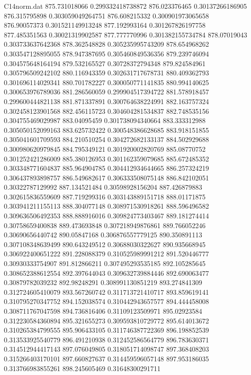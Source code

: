\begin{filecontents}{C14norm.dat}
875.731018066			0.299332418738872
876.023376465			0.30137266186905
876.315795898			0.303059049264751
876.608215332			0.300901973065658
876.90057373			0.301521149913248
877.192993164			0.301267826197758
877.485351563			0.30021319902587
877.777770996			0.301382155734784
878.07019043			0.303733637642368
878.362548828			0.305235995743209
878.654968262			0.303547128895055
878.947387695			0.305460849536356
879.239746094			0.304575648164194
879.532165527			0.30728372794348
879.824584961			0.305796509242102
880.116943359			0.302631717678731
880.409362793			0.301696114029341
880.701782227			0.300050771141835
880.994140625			0.300653976789036
881.286560059			0.299904517394722
881.578918457			0.299600444821138
881.871337891			0.300764638224991
882.163757324			0.302458123901568
882.456115723			0.304604281534837
882.748535156			0.304755469029987
883.04095459			0.301738094340664
883.333312988			0.305050152099163
883.625732422			0.300548386628685
883.918151855			0.305041601709593
884.210510254			0.304272682133137
884.502929688			0.300980620979845
884.795349121			0.301920002820769
885.08770752			0.301252421286009
885.380126953			0.301162359079685
885.672485352			0.303348771604837
885.964904785			0.304412934644665
886.257324219			0.306437893898757
886.549682617			0.306333508075148
886.842102051			0.30322787129992
887.134521484			0.30598928156204
887.426879883			0.302615836559609
887.719299316			0.303143889151718
888.01171875			0.303941211155113
888.304077148			0.308971530918261
888.596496582			0.309636506492353
888.888916016			0.309824773403467
889.181274414			0.30758659400838
889.473693848			0.307218949876861
889.766052246			0.30690656440742
890.05847168			0.306876557779125
890.350891113			0.307108348639499
890.643249512			0.30688030322627
890.935668945			0.306922400651222
891.228088379			0.310525989991212
891.520446777			0.30930333754907
891.812866211			0.307495293535185
892.105285645			0.308652388612554
892.397644043			0.309632739884446
892.690063477			0.30879782039232
892.98248291			0.308991130851219
893.274841309			0.312724605410079
893.567260742			0.311713721410717
893.859619141			0.310795270347752
894.152038574			0.310442943657577
894.444458008			0.308711767047598
894.736816406			0.31109123509971
895.02923584			0.312230584360894
895.321655273			0.309593810729772
895.614013672			0.310265384799555
895.906433105			0.311746387722369
896.198852539			0.313533925540779
896.491210938			0.312452586564779
896.783630371			0.314512944417143
897.076049805			0.318051714098747
897.368408203			0.315266403170101
897.660827637			0.314459596057148
897.953186035			0.313766983855261
898.245605469			0.31648300291711

\end{filecontents}
